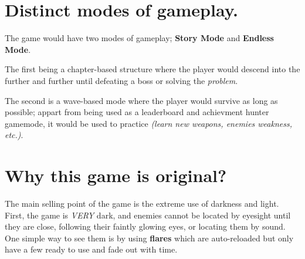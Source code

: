 
\section{Distinct modes of gameplay.}
The game would have two modes of gameplay; \textbf{Story Mode} and \textbf{Endless Mode}.

The first being a chapter-based structure where the player would descend into the \hole further and further until defeating a boss or solving the \hole \textit{problem}.

The second is a wave-based mode where the player would survive as long as possible; appart from being used as a leaderboard and achievment hunter gamemode, it would be used to practice \textit{(learn new weapons, enemies weakness, etc.)}.


\section{Why this game is original?}
The main selling point of the game is the extreme use of darkness and light. First, the game is \textit{VERY} dark, and enemies cannot be located by eyesight until they are close, following their faintly glowing eyes, or locating them by sound. One simple way to see them is by using \textbf{flares} which are auto-reloaded but only have a few ready to use and fade out with time.

